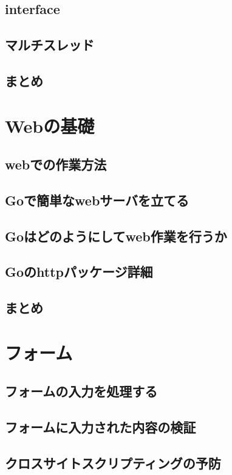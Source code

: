 \subsection{interface}

\subsection{マルチスレッド}

\subsection{まとめ}



\section{Webの基礎}

\subsection{webでの作業方法}

\subsection{Goで簡単なwebサーバを立てる}

\subsection{Goはどのようにしてweb作業を行うか}

\subsection{Goのhttpパッケージ詳細}

\subsection{まとめ}


\section{フォーム}

\subsection{フォームの入力を処理する}

\subsection{フォームに入力された内容の検証}

\subsection{クロスサイトスクリプティングの予防}


